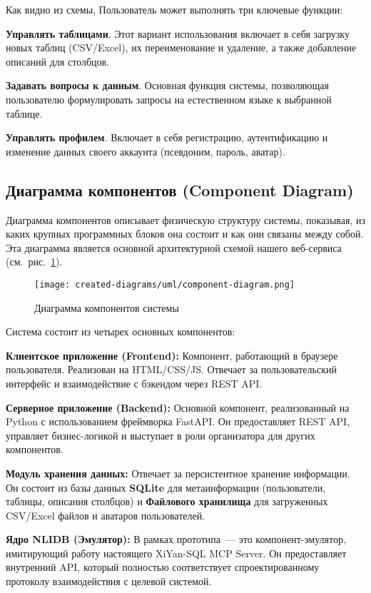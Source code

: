 Как видно из схемы, Пользователь может выполнять три ключевые функции:
\begin{compactitem}
      \item \textbf{Управлять таблицами}. Этот вариант использования включает в себя загрузку
      новых таблиц (CSV/Excel), их переименование и удаление, а также добавление
      описаний для столбцов.
      \item \textbf{Задавать вопросы к данным}. Основная функция системы,
      позволяющая пользователю формулировать запросы на естественном языке к выбранной таблице.
      \item \textbf{Управлять профилем}. Включает в себя регистрацию, аутентификацию и
      изменение данных своего аккаунта (псевдоним, пароль, аватар).
\end{compactitem}

\subsection{Диаграмма компонентов (Component Diagram)}

Диаграмма компонентов описывает физическую структуру системы, показывая,
из каких крупных программных блоков она состоит и как они связаны между собой.
Эта диаграмма является основной архитектурной схемой нашего веб-сервиса
(см.~рис.~\ref{fig:component-diagram}).

\begin{figure}[ht]
      \centering
      \texttt{[image: created-diagrams/uml/component-diagram.png]}
      \caption{Диаграмма компонентов системы}
      \label{fig:component-diagram}
\end{figure}

Система состоит из четырех основных компонентов:
\begin{compactenum}
      \item \textbf{Клиентское приложение (Frontend):} Компонент, работающий в браузере пользователя.
      Реализован на HTML/CSS/JS. Отвечает за пользовательский интерфейс и взаимодействие с
      бэкендом через REST API.
      \item \textbf{Серверное приложение (Backend):} Основной компонент, реализованный на
      Python с использованием фреймворка FastAPI. Он предоставляет REST API,
      управляет бизнес-логикой и выступает в роли организатора для других компонентов.
      \item \textbf{Модуль хранения данных:} Отвечает за персистентное хранение информации.
      Он состоит из базы данных \textbf{SQLite} для метаинформации
      (пользователи, таблицы, описания столбцов) и \textbf{Файлового хранилища} для
      загруженных CSV/Excel файлов и аватаров пользователей.
      \item \textbf{Ядро NLIDB (Эмулятор):} В рамках прототипа~--- это компонент-эмулятор,
      имитирующий работу настоящего XiYan-SQL MCP Server. Он предоставляет внутренний API,
      который полностью соответствует спроектированному протоколу взаимодействия с целевой системой.
\end{compactenum}

